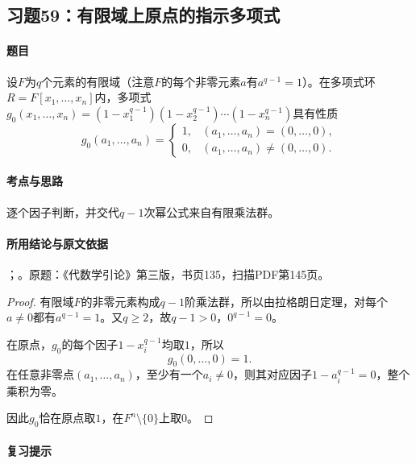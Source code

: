 \subsection{习题59：有限域上原点的指示多项式}

\label{ex:3:59}

\paragraph{题目}

设$F$为$q$个元素的有限域（注意$F$的每个非零元素$a$有$a^{q-1}=1$）。在多项式环$R=F[x_1,\ldots,x_n]$内，多项式$g_0(x_1,\ldots,x_n)=(1-x_1^{q-1})(1-x_2^{q-1})\cdots(1-x_n^{q-1})$具有性质
\[
g_0(a_1,\ldots,a_n)=\begin{cases}
1,&(a_1,\ldots,a_n)=(0,\ldots,0),\\
0,&(a_1,\ldots,a_n)\ne(0,\ldots,0).
\end{cases}\tag{1}
\]

\paragraph{考点与思路}

逐个因子判断，并交代$q-1$次幂公式来自有限乘法群。

\paragraph{所用结论与原文依据}

；。原题：《代数学引论》第三版，书页135，扫描PDF第145页。


\begin{proof}

有限域$F$的非零元素构成$q-1$阶乘法群，所以由拉格朗日定理，对每个$a\ne0$都有$a^{q-1}=1$。又$q\ge2$，故$q-1>0$，$0^{q-1}=0$。

在原点，$g_0$的每个因子$1-x_i^{q-1}$均取$1$，所以
\[
g_0(0,\ldots,0)=1.
\]
在任意非零点$(a_1,\ldots,a_n)$，至少有一个$a_i\ne0$，则其对应因子$1-a_i^{q-1}=0$，整个乘积为零。

因此$g_0$恰在原点取$1$，在$F^n\setminus\{0\}$上取$0$。

\end{proof}

\paragraph{复习提示}

